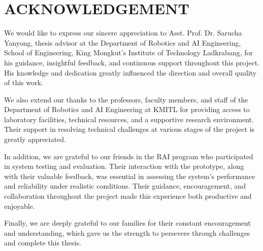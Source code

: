 \chapter*{ACKNOWLEDGEMENT}

We would like to express our sincere appreciation to Asst. Prof. Dr. Sarucha Yanyong, thesis advisor at the Department of Robotics and AI Engineering, School of Engineering, King Mongkut’s Institute of Technology Ladkrabang, for his guidance, insightful feedback, and continuous support throughout this project. His knowledge and dedication greatly influenced the direction and overall quality of this work.

We also extend our thanks to the professors, faculty members, and staff of the Department of Robotics and AI Engineering at KMITL for providing access to laboratory facilities, technical resources, and a supportive research environment. Their support in resolving technical challenges at various stages of the project is greatly appreciated.

In addition, we are grateful to our friends in the RAI program who participated in system testing and evaluation. Their interaction with the prototype, along with their valuable feedback, was essential in assessing the system’s performance and reliability under realistic conditions. Their guidance, encouragement, and collaboration throughout the project made this experience both productive and enjoyable.

Finally, we are deeply grateful to our families for their constant encouragement and understanding, which gave us the strength to persevere through challenges and complete this thesis.

